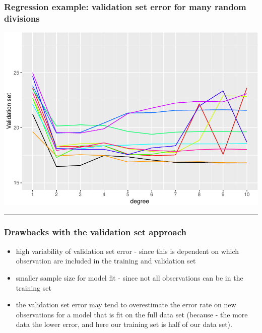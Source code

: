 \documentclass[]{article}
\providecommand{\tightlist}{%
  \setlength{\itemsep}{0pt}\setlength{\parskip}{0pt}}
\begin{document}
\hypertarget{regression-example-validation-set-error-for-many-random-divisions}{%
\subsubsection{Regression example: validation set error for many random
divisions}\label{regression-example-validation-set-error-for-many-random-divisions}}

\includegraphics{5Resample_files/figure-latex/unnamed-chunk-2-1.pdf}

\begin{center}\rule{0.5\linewidth}{\linethickness}\end{center}

\hypertarget{drawbacks-with-the-validation-set-approach}{%
\subsubsection{Drawbacks with the validation set
approach}\label{drawbacks-with-the-validation-set-approach}}

\begin{itemize}
\tightlist
\item
  high variability of validation set error - since this is dependent on
  which observation are included in the training and validation set
\item
  smaller sample size for model fit - since not all observations can be
  in the training set
\item
  the validation set error may tend to overestimate the error rate on
  new observations for a model that is fit on the full data set (because
  - the more data the lower error, and here our training set is half of
  our data set).
\end{itemize}
\end{document}
